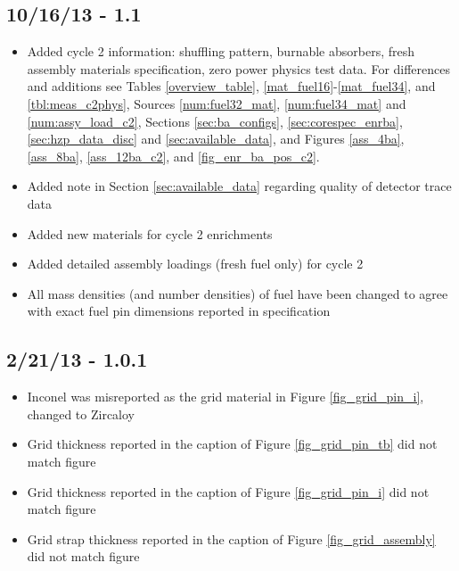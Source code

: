 \subsection*{10/16/13 - 1.1}
\begin{itemize}
  \item Added cycle 2 information: shuffling pattern, burnable absorbers, fresh
    assembly materials specification, zero power physics test data. For
    differences and additions see Tables \ref{overview_table},
    \ref{mat_fuel16}-\ref{mat_fuel34}, and \ref{tbl:meas_c2phys}, Sources
    \ref{num:fuel32_mat}, \ref{num:fuel34_mat} and \ref{num:assy_load_c2},
    Sections \ref{sec:ba_configs}, \ref{sec:corespec_enrba},
    \ref{sec:hzp_data_disc} and \ref{sec:available_data}, and Figures
    \ref{ass_4ba}, \ref{ass_8ba}, \ref{ass_12ba_c2}, and
    \ref{fig_enr_ba_pos_c2}.
  \item Added note in Section \ref{sec:available_data} regarding quality of
  detector trace data
  \item Added new materials for cycle 2 enrichments
  \item Added detailed assembly loadings (fresh fuel only) for cycle 2
  \item All mass densities (and number densities) of fuel have been changed to
        agree with exact fuel pin dimensions reported in specification
\end{itemize}

\subsection*{2/21/13 - 1.0.1}
\begin{itemize}
  \item Inconel was misreported as the grid material in Figure \ref{fig_grid_pin_i}, changed to Zircaloy
  \item Grid thickness reported in the caption of Figure \ref{fig_grid_pin_tb} did not match figure
  \item Grid thickness reported in the caption of Figure \ref{fig_grid_pin_i} did not match figure
  \item Grid strap thickness reported in the caption of Figure \ref{fig_grid_assembly} did not match figure
\end{itemize}

